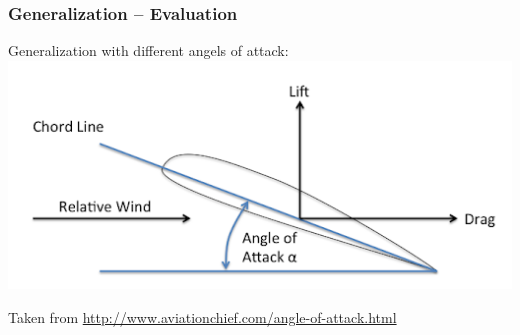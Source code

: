\begin{frame}
    \frametitle{Generalization -- Evaluation}
    \vspace*{0.8cm}






Generalization with different angels of attack: \\[\baselineskip]

\includegraphics[width=.5\textwidth, height=.4\textheight]{./Ressourcen/Praesentation/Bilder/aoa.png}%
\newline

Taken from \url{http://www.aviationchief.com/angle-of-attack.html}

\end{frame}
\clearpage

